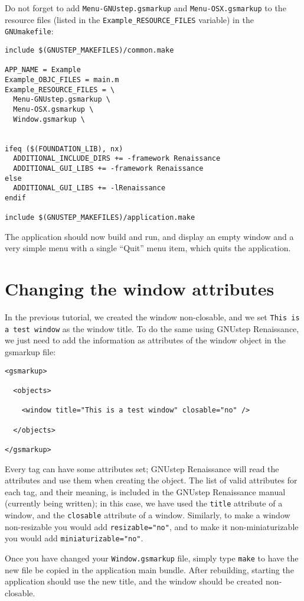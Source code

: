 \documentclass[a4paper]{article}
\begin{document}
Do not forget to add \texttt{Menu-GNUstep.gsmarkup} and
\texttt{Menu-OSX.gsmarkup} to the resource files (listed
in the \texttt{Example\_RESOURCE\_FILES} variable) in the
\texttt{GNUmakefile}:
\begin{verbatim}
include $(GNUSTEP_MAKEFILES)/common.make

APP_NAME = Example
Example_OBJC_FILES = main.m
Example_RESOURCE_FILES = \
  Menu-GNUstep.gsmarkup \
  Menu-OSX.gsmarkup \
  Window.gsmarkup \


ifeq ($(FOUNDATION_LIB), nx)
  ADDITIONAL_INCLUDE_DIRS += -framework Renaissance
  ADDITIONAL_GUI_LIBS += -framework Renaissance
else
  ADDITIONAL_GUI_LIBS += -lRenaissance
endif

include $(GNUSTEP_MAKEFILES)/application.make
\end{verbatim}

The application should now build and run, and display an empty window
and a very simple menu with a single ``Quit'' menu item, which quits
the application.

\section{Changing the window attributes}
In the previous tutorial, we created the window non-closable, and we
set \texttt{This is a test window} as the window title.  To do the same
using GNUstep Renaissance, we just need to add the information as
attributes of the window object in the gsmarkup file:
\begin{verbatim}
<gsmarkup>

  <objects>

    <window title="This is a test window" closable="no" />

  </objects>

</gsmarkup>
\end{verbatim}
Every tag can have some attributes set; GNUstep Renaissance will read
the attributes and use them when creating the object.  The list of
valid attributes for each tag, and their meaning, is included in the
GNUstep Renaissance manual (currently being written); in this case, we
have used the \texttt{title} attribute of a window, and the
\texttt{closable} attribute of a window.  Similarly, to make a window 
non-resizable you would add \texttt{resizable="no"}, and to make it
non-miniaturizable you would add \texttt{miniaturizable="no"}.

Once you have changed your \texttt{Window.gsmarkup} file, simply type
\texttt{make} to have the new file be copied in the application main bundle.
After rebuilding, starting the application should use the new title,
and the window should be created non-closable.
\end{document}
